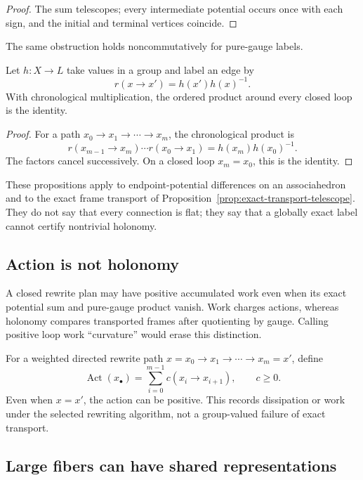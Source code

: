 \begin{proof}
The sum telescopes; every intermediate potential occurs once with each sign,
and the initial and terminal vertices coincide.
\end{proof}

The same obstruction holds noncommutatively for pure-gauge labels.

\begin{proposition}
\label{prop:pure-gauge-obstruction}
Let $h:X\to L$ take values in a group and label an edge by
\[
  r(x\to x')=h(x')h(x)^{-1}.
\]
With chronological multiplication, the ordered product around every closed
loop is the identity.
\end{proposition}

\begin{proof}
For a path $x_0\to x_1\to\cdots\to x_m$, the chronological product is
\[
 r(x_{m-1}\to x_m)\cdots r(x_0\to x_1)
 =h(x_m)h(x_0)^{-1}.
\]
The factors cancel successively.  On a closed loop $x_m=x_0$, this is the
identity.
\end{proof}

These propositions apply to endpoint-potential differences on an associahedron
and to the exact frame transport of
Proposition~\ref{prop:exact-transport-telescope}.  They do not say that every
connection is flat; they say that a globally exact label cannot certify
nontrivial holonomy.

\subsection{Action is not holonomy}

A closed rewrite plan may have positive accumulated work even when its exact
potential sum and pure-gauge product vanish.  Work charges actions, whereas
holonomy compares transported frames after quotienting by gauge.  Calling
positive loop work ``curvature'' would erase this distinction.

For a weighted directed rewrite path
$x=x_0\to x_1\to\cdots\to x_m=x'$, define
\[
  \operatorname{Act}(x_\bullet)=\sum_{i=0}^{m-1}c(x_i\to x_{i+1}),
  \qquad c\ge0.
\]
Even when $x=x'$, the action can be positive.  This records dissipation or work
under the selected rewriting algorithm, not a group-valued failure of exact
transport.

\subsection{Large fibers can have shared representations}


